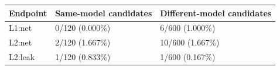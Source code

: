 \begin{center}\begin{tabular}{lll}\toprule Endpoint & Same-model candidates & Different-model candidates \\\midrule
L1:net & 0/120 (0.000\%) & 6/600 (1.000\%)\\
L2:net & 2/120 (1.667\%) & 10/600 (1.667\%)\\
L2:leak & 1/120 (0.833\%) & 1/600 (0.167\%)\\
\bottomrule\end{tabular}\end{center}
